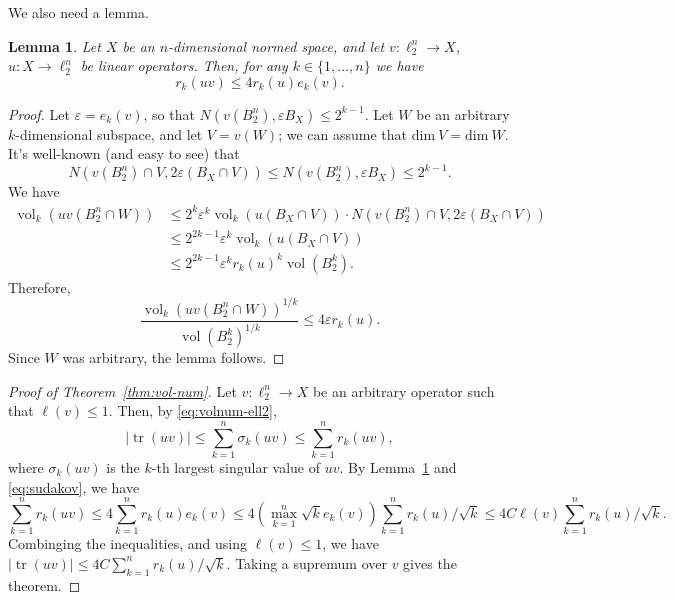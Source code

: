 \documentclass{article}
\newtheorem{lemma}{Lemma}
\newcommand\eps{\varepsilon}
\DeclareMathOperator{\vol}{vol}
\DeclareMathOperator{\tr}{tr}
\begin{document}
We also need a lemma.
\begin{lemma}\label{lm:r-vs-e}
  Let $X$ be an $n$-dimensional normed space, and let $v:\ell_2^n \to
  X$, $u:X\to\ell_2^n$ be linear operators. Then, for any $k \in \{1,
  \ldots, n\}$ we have
  \[
  r_k(uv) \le 4r_k(u)e_k(v).
  \]
\end{lemma}
\begin{proof}
  Let $\eps = e_k(v)$, so that $N(v(B_2^n), \eps B_X) \le 2^{k-1}$.
  Let $W$ be an arbitrary $k$-dimensional subspace, and let $V =
  v(W)$; we can assume that $\mathrm{dim}\ V = \mathrm{dim}\ W$. It's
  well-known (and easy to see) that
  \begin{equation}
    \label{eq:cover-subsp}
    N(v(B_2^n) \cap V, 2\eps (B_X \cap V)) \le 
    N(v(B_2^n), \eps B_X) \le 2^{k-1}.
  \end{equation}
  We have
  \begin{align*}
    \vol_k(uv(B_2^n \cap W)) 
    &\le 2^k \eps^k \vol_k(u(B_X \cap V)) 
    \cdot
    N(v(B_2^n) \cap V, 2\eps (B_X \cap V))\\
    &\le 2^{2k - 1} \eps^k \vol_k(u(B_X \cap V)) \\
    &\le 2^{2k-1}\eps^k r_k(u)^k \vol(B_2^k).
  \end{align*}
  Therefore, 
  \[
  \frac{\vol_k(uv(B_2^n \cap W))^{1/k}}{\vol(B_2^k)^{1/k}}
  \le 
  4\eps r_k(u).
  \]
  Since $W$ was arbitrary, the lemma follows.
\end{proof}

\begin{proof}[Proof of Theorem~\ref{thm:vol-num}]
  Let $v:\ell_2^n \to X$ be an arbitrary operator such that $\ell(v)
  \le 1$. Then, by \eqref{eq:volnum-ell2},
  \[
  |\tr(uv)| 
  \le \sum_{k = 1}^n{\sigma_k(uv)} \le \sum_{k=1}^n{r_k(uv)},
  \]
  where $\sigma_k(uv)$ is the $k$-th largest singular value of
  $uv$. By Lemma~\ref{lm:r-vs-e} and \eqref{eq:sudakov}, we have
  \[
  \sum_{k=1}^n{r_k(uv)} \le 4 \sum_{k = 1}^n{r_k(u)e_k(v)}
  \le 4 \left(\max_{k = 1}^n{\sqrt{k} e_k(v)}\right) \sum_{k = 1}^n{r_k(u)/\sqrt{k}}
  \le 4C \ell(v)\sum_{k = 1}^n{r_k(u)/\sqrt{k}}. 
  \]
  Combinging the inequalities, and using $\ell(v) \le 1$, we have
  $|\tr(uv)| \le 4C\sum_{k = 1}^n{r_k(u)/\sqrt{k}}$. Taking a supremum
  over $v$ gives the theorem. 
\end{proof}
\end{document}
